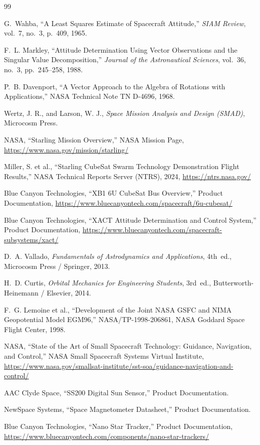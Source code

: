 \documentclass[12pt]{article}
\begin{document}
\begin{thebibliography}{99}

G.~Wahba,
``A Least Squares Estimate of Spacecraft Attitude,''
\textit{SIAM Review}, vol.~7, no.~3, p.~409, 1965.

F.~L. Markley,
``Attitude Determination Using Vector Observations and the Singular Value Decomposition,''
\textit{Journal of the Astronautical Sciences}, vol.~36, no.~3, pp.~245--258, 1988.

P.~B. Davenport,
``A Vector Approach to the Algebra of Rotations with Applications,''
NASA Technical Note TN D-4696, 1968.

Wertz, J. R., and Larson, W. J.,
\textit{Space Mission Analysis and Design (SMAD)},
Microcosm Press.

NASA,
``Starling Mission Overview,''
NASA Mission Page,
\url{https://www.nasa.gov/mission/starling/}

Miller, S. et al.,
``Starling CubeSat Swarm Technology Demonstration Flight Results,''
NASA Technical Reports Server (NTRS), 2024,
\url{https://ntrs.nasa.gov/}

Blue Canyon Technologies,
``XB1 6U CubeSat Bus Overview,''
Product Documentation,
\url{https://www.bluecanyontech.com/spacecraft/6u-cubesat/}

Blue Canyon Technologies,
``XACT Attitude Determination and Control System,''
Product Documentation,
\url{https://www.bluecanyontech.com/spacecraft-subsystems/xact/}

D.~A. Vallado,
\textit{Fundamentals of Astrodynamics and Applications}, 4th~ed.,
Microcosm Press / Springer, 2013.

H.~D. Curtis,
\textit{Orbital Mechanics for Engineering Students}, 3rd~ed.,
Butterworth-Heinemann / Elsevier, 2014.

F.~G. Lemoine et al.,
``Development of the Joint NASA GSFC and NIMA Geopotential Model EGM96,''
NASA/TP-1998-206861, NASA Goddard Space Flight Center, 1998.

NASA,
``State of the Art of Small Spacecraft Technology: Guidance, Navigation, and Control,''
NASA Small Spacecraft Systems Virtual Institute,
\url{https://www.nasa.gov/smallsat-institute/sst-soa/guidance-navigation-and-control/}

AAC Clyde Space,
``SS200 Digital Sun Sensor,''
Product Documentation.

NewSpace Systems,
``Space Magnetometer Datasheet,''
Product Documentation.

Blue Canyon Technologies,
``Nano Star Tracker,''
Product Documentation,
\url{https://www.bluecanyontech.com/components/nano-star-trackers/}

\end{thebibliography}
\end{document}
